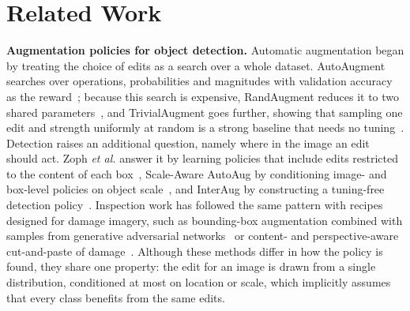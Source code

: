 \documentclass[conference]{IEEEtran}
\begin{document}
\section{Related Work}
\label{sec:related}

\noindent\textbf{Augmentation policies for object detection.} Automatic augmentation began by treating the choice of edits as a search over a whole dataset. AutoAugment searches over operations, probabilities and magnitudes with validation accuracy as the reward~\cite{cubuk2019auto}; because this search is expensive, RandAugment reduces it to two shared parameters~\cite{cubuk2020rand}, and TrivialAugment goes further, showing that sampling one edit and strength uniformly at random is a strong baseline that needs no tuning~\cite{muller2021trivial}. Detection raises an additional question, namely where in the image an edit should act. Zoph \emph{et al.} answer it by learning policies that include edits restricted to the content of each box~\cite{zoph2020det}, Scale-Aware AutoAug by conditioning image- and box-level policies on object scale~\cite{chen2021scale}, and InterAug by constructing a tuning-free detection policy~\cite{thopalli2023interaug}. Inspection work has followed the same pattern with recipes designed for damage imagery, such as bounding-box augmentation combined with samples from generative adversarial networks~\cite{aghayan2024} or content- and perspective-aware cut-and-paste of damage~\cite{rdd_cutpaste}. Although these methods differ in how the policy is found, they share one property: the edit for an image is drawn from a single distribution, conditioned at most on location or scale, which implicitly assumes that every class benefits from the same edits.
\end{document}
